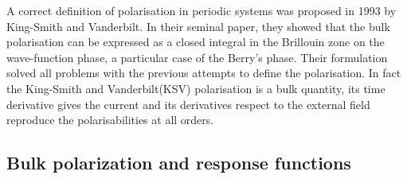 A correct definition of polarisation in periodic systems was proposed in 1993 by  King-Smith and Vanderbilt.\cite{KSV1} In their seminal paper, they showed that the bulk polarisation can be expressed as a closed integral in the Brillouin zone on the wave-function phase, a particular case of the Berry's phase. Their formulation solved all problems with the previous attempts to define the polarisation. In fact the King-Smith and Vanderbilt(KSV) polarisation is a bulk quantity, its time derivative gives the current and its derivatives respect to the external field reproduce the polarisabilities at all orders.


\subsection{Bulk polarization and response functions}


